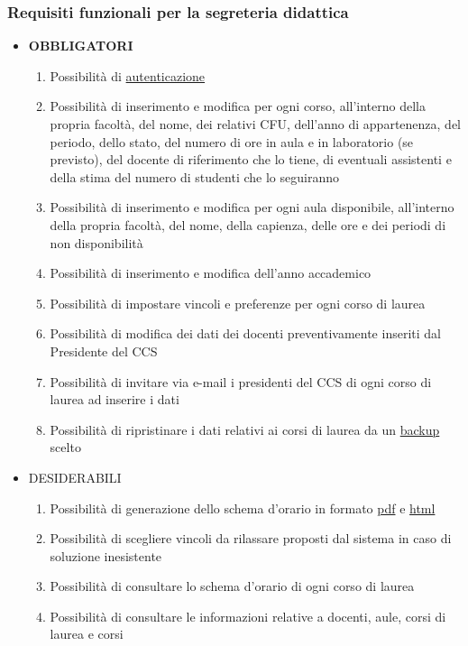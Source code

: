 \documentclass[11pt,a4paper]{article}
\begin{document}
\subsubsection{Requisiti funzionali per la segreteria didattica}
\begin{itemize}
\item \textbf{OBBLIGATORI}
\begin{enumerate}
\item Possibilità di \underline{autenticazione}
\item Possibilità di inserimento e modifica per ogni corso, all'interno della propria facoltà, del nome, dei relativi CFU, dell'anno di appartenenza, del periodo, dello stato, del numero di ore in aula e in laboratorio (se previsto), del docente di riferimento che lo tiene, di eventuali assistenti e della stima del numero di studenti che lo seguiranno
\item Possibilità di inserimento e modifica per ogni aula disponibile, all'interno della propria facoltà, del nome, della capienza, delle ore e dei periodi di non disponibilità
\item Possibilità di inserimento e modifica dell'anno accademico
\item Possibilità di impostare vincoli e preferenze per ogni corso di laurea
\item Possibilità di modifica dei dati dei docenti preventivamente inseriti dal Presidente del CCS
\item Possibilità di invitare via e-mail i presidenti del CCS di ogni corso di laurea ad inserire i dati
\item Possibilità di ripristinare i dati relativi ai corsi di laurea da un \underline{backup} scelto
\end{enumerate}
\item \textsc{DESIDERABILI}
\begin{enumerate}
\item Possibilità di generazione dello schema d'orario in formato \underline{pdf} e \underline{html}
\item Possibilità di scegliere vincoli da rilassare proposti dal sistema in caso di soluzione inesistente
\item Possibilità di consultare lo schema d'orario di ogni corso di laurea
\item Possibilità di consultare le informazioni relative a docenti, aule, corsi di laurea e corsi
\end{enumerate}
\end{itemize}
\end{document}
